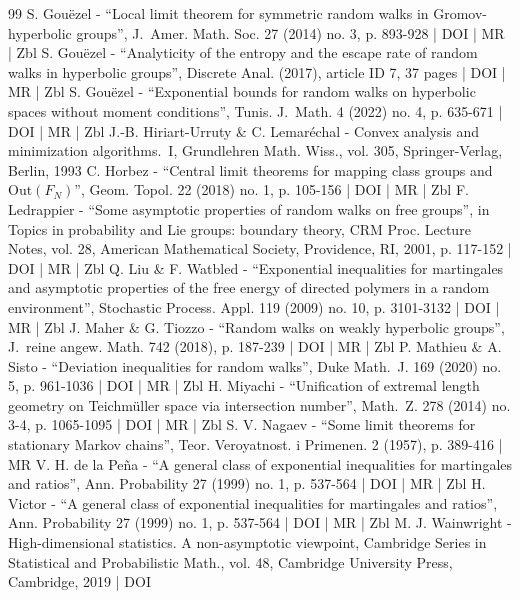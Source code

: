 \begin{thebibliography}{99}
S. Gouëzel - “Local limit theorem for symmetric random walks in Gromov-hyperbolic groups”, J. Amer. Math. Soc. 27 (2014) no. 3, p. 893-928 | DOI | MR | Zbl
S. Gouëzel - “Analyticity of the entropy and the escape rate of random walks in hyperbolic groups”, Discrete Anal. (2017), article ID 7, 37 pages | DOI | MR | Zbl
S. Gouëzel - “Exponential bounds for random walks on hyperbolic spaces without moment conditions”, Tunis. J. Math. 4 (2022) no. 4, p. 635-671 | DOI | MR | Zbl
J.-B. Hiriart-Urruty \& C. Lemaréchal - Convex analysis and minimization algorithms. I, Grundlehren Math. Wiss., vol. 305, Springer-Verlag, Berlin, 1993
C. Horbez - “Central limit theorems for mapping class groups and $\mathrm{Out}(F_N)$”, Geom. Topol. 22 (2018) no. 1, p. 105-156 | DOI | MR | Zbl
F. Ledrappier - “Some asymptotic properties of random walks on free groups”, in Topics in probability and Lie groups: boundary theory, CRM Proc. Lecture Notes, vol. 28, American Mathematical Society, Providence, RI, 2001, p. 117-152 | DOI | MR | Zbl
Q. Liu \& F. Watbled - “Exponential inequalities for martingales and asymptotic properties of the free energy of directed polymers in a random environment”, Stochastic Process. Appl. 119 (2009) no. 10, p. 3101-3132 | DOI | MR | Zbl
J. Maher \& G. Tiozzo - “Random walks on weakly hyperbolic groups”, J. reine angew. Math. 742 (2018), p. 187-239 | DOI | MR | Zbl
P. Mathieu \& A. Sisto - “Deviation inequalities for random walks”, Duke Math. J. 169 (2020) no. 5, p. 961-1036 | DOI | MR | Zbl
H. Miyachi - “Unification of extremal length geometry on Teichmüller space via intersection number”, Math. Z. 278 (2014) no. 3-4, p. 1065-1095 | DOI | MR | Zbl
S. V. Nagaev - “Some limit theorems for stationary Markov chains”, Teor. Veroyatnost. i Primenen. 2 (1957), p. 389-416 | MR
V. H. de la Peña - “A general class of exponential inequalities for martingales and ratios”, Ann. Probability 27 (1999) no. 1, p. 537-564 | DOI | MR | Zbl
H. Victor - “A general class of exponential inequalities for martingales and ratios”, Ann. Probability 27 (1999) no. 1, p. 537-564 | DOI | MR | Zbl
M. J. Wainwright - High-dimensional statistics. A non-asymptotic viewpoint, Cambridge Series in Statistical and Probabilistic Math., vol. 48, Cambridge University Press, Cambridge, 2019 | DOI
\end{thebibliography}

